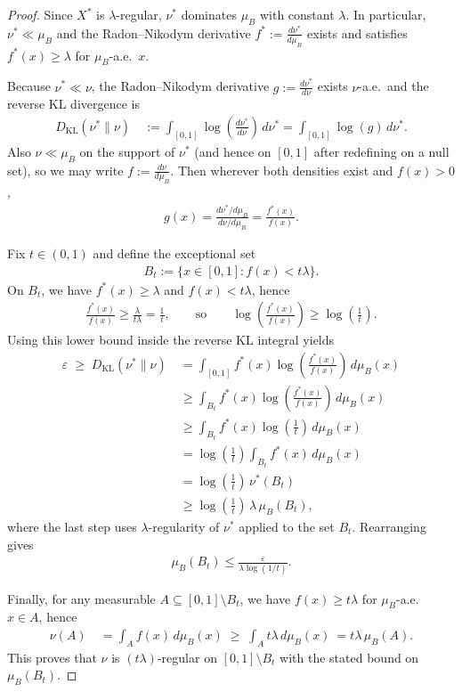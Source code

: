 \documentclass[11pt]{article}
\theoremstyle{statplain}
\theoremstyle{statdefinition}
\newcommand{\0}{\mathbf{0}}
\begin{document}
\begin{proof}
Since $X^*$ is $\lambda$-regular, $\nu^*$ dominates $\mu_B$ with constant $\lambda$. In particular, $\nu^*\ll \mu_B$ and the Radon--Nikodym derivative $f^* := \frac{d\nu^*}{d\mu_B}$ exists and satisfies $f^*(x)\ge \lambda$ for $\mu_B$-a.e.\ $x$.

Because $\nu^*\ll \nu$, the Radon--Nikodym derivative $g := \frac{d\nu^*}{d\nu}$ exists $\nu$-a.e.\ and the reverse KL divergence is
\begin{align*}
D_{\mathrm{KL}}(\nu^*\|\nu)
&~:= \int_{[0,1]} \log\!\left(\frac{d\nu^*}{d\nu}\right)\, d\nu^*
 = \int_{[0,1]} \log(g)\, d\nu^*.
\end{align*}
Also $\nu\ll \mu_B$ on the support of $\nu^*$ (and hence on $[0,1]$ after redefining on a null set), so we may write $f:=\frac{d\nu}{d\mu_B}$. Then wherever both densities exist and $f(x)>0$,
\begin{align*}
g(x)=\frac{d\nu^*/d\mu_B}{d\nu/d\mu_B}=\frac{f^*(x)}{f(x)}.
\end{align*}

Fix $t\in(0,1)$ and define the exceptional set
\begin{align*}
B_t := \{x\in[0,1]: f(x) < t\lambda\}.
\end{align*}
On $B_t$, we have $f^*(x)\ge \lambda$ and $f(x)<t\lambda$, hence
\begin{align*}
\frac{f^*(x)}{f(x)} \ge \frac{\lambda}{t\lambda}=\frac1t,
\qquad\text{so}\qquad
\log\!\left(\frac{f^*(x)}{f(x)}\right) \ge \log\!\left(\frac1t\right).
\end{align*}
Using this lower bound inside the reverse KL integral yields
\begin{align*}
\varepsilon
\;\ge\; D_{\mathrm{KL}}(\nu^*\|\nu)
&~= \int_{[0,1]} f^*(x)\log\!\left(\frac{f^*(x)}{f(x)}\right)\, d\mu_B(x)\\
&~\ge \int_{B_t} f^*(x)\log\!\left(\frac{f^*(x)}{f(x)}\right)\, d\mu_B(x)\\
&~\ge \int_{B_t} f^*(x)\log\!\left(\frac1t\right)\, d\mu_B(x)\\
&~= \log\!\left(\frac1t\right)\int_{B_t} f^*(x)\, d\mu_B(x)\\
&~= \log\!\left(\frac1t\right)\,\nu^*(B_t)\\
&~\ge \log\!\left(\frac1t\right)\,\lambda\,\mu_B(B_t),
\end{align*}
where the last step uses $\lambda$-regularity of $\nu^*$ applied to the set $B_t$. Rearranging gives
\begin{align*}
\mu_B(B_t)\le \frac{\varepsilon}{\lambda\log(1/t)}.
\end{align*}

Finally, for any measurable $A\subseteq [0,1]\setminus B_t$, we have $f(x)\ge t\lambda$ for $\mu_B$-a.e.\ $x\in A$, hence
\begin{align*}
\nu(A)
&~= \int_A f(x)\, d\mu_B(x)
\;\ge\; \int_A t\lambda\, d\mu_B(x)
~= t\lambda\,\mu_B(A).
\end{align*}
This proves that $\nu$ is $(t\lambda)$-regular on $[0,1]\setminus B_t$ with the stated bound on $\mu_B(B_t)$.
\end{proof}
\fi
\end{document}
